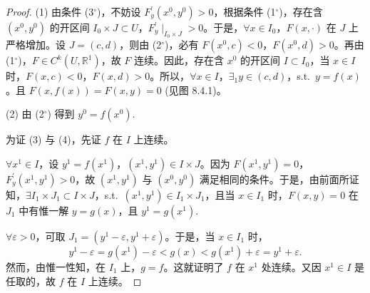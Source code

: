 \begin{proof}
(1) 由条件 (3$^\circ$)，不妨设 $F_{y}^{\prime}(x^{0},y^{0}) > 0$，根据条件 (1$^\circ$)，存在含 $(x^{0},y^{0})$ 的开区间 $I_{0} \times J \subset U$，$F_{y}^{\prime}\mid_{I_{0} \times J} > 0$。于是，$\forall x \in I_{0}$，$F(x,\cdot)$ 在 $J$ 上严格增加。设 $J = (c,d)$，则由 (2$^\circ$)，必有 $F(x^{0},c) < 0$，$F(x^{0},d) > 0$。再由 (1$^\circ$)，$F \in C^{k}(U,\mathbb{R}^{1})$，故 $F$ 连续。因此，存在含 $x^{0}$ 的开区间 $I \subset I_{0}$，当 $x \in I$ 时，$F(x,c) < 0$，$F(x,d) > 0$。所以，$\forall x \in I$，$\exists_{1} y \in (c,d)$，s.t.\ $y = f(x)$。且 $F(x,f(x)) = F(x,y) = 0$ (见图 8.4.1)。

(2) 由 (2$^\circ$) 得到 $y^{0} = f(x^{0})$.

为证 (3) 与 (4)，先证 $f$ 在 $I$ 上连续。

$\forall x^{1} \in I$，设 $y^{1} = f(x^{1})$，$(x^{1},y^{1}) \in I \times J$。因为 $F(x^{1},y^{1}) = 0$，$F_{y}^{\prime}(x^{1},y^{1}) > 0$，故 $(x^{1},y^{1})$ 与 $(x^{0},y^{0})$ 满足相同的条件。于是，由前面所证知，$\exists I_{1} \times J_{1} \subset I \times J$，s.t.\ $(x^{1},y^{1}) \in I_{1} \times J_{1}$，且当 $x \in I_{1}$ 时，$F(x,y) = 0$ 在 $J_{1}$ 中有惟一解 $y = g(x)$，且 $y^{1} = g(x^{1})$.

$\forall \varepsilon > 0$，可取 $J_{1} = (y^{1} - \varepsilon,y^{1} + \varepsilon)$。于是，当 $x \in I_{1}$ 时，
\[
  y^{1} - \varepsilon = g(x^{1}) - \varepsilon < g(x) < g(x^{1}) + \varepsilon = y^{1} + \varepsilon.
\]
然而，由惟一性知，在 $I_{1}$ 上，$g = f$。这就证明了 $f$ 在 $x^{1}$ 处连续。又因 $x^{1} \in I$ 是任取的，故 $f$ 在 $I$ 上连续。


\end{proof}
